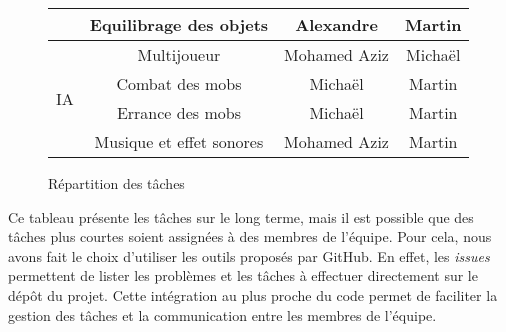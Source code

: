 \begin{figure}[H]
\begin{tabular}{|c|c|c|c|}
            \cline{2-4}
            & Equilibrage des objets & Alexandre & Martin \\
        \hline\hline
            & Multijoueur & Mohamed Aziz & Michaël \\
            \hline\hline
            \multirow{2}{*}{IA} & Combat des mobs & Michaël & Martin \\
            \cline{2-4}
            & Errance des mobs & Michaël & Martin \\
        \hline\hline
            & Musique et effet sonores & Mohamed Aziz & Martin \\
        \hline
    \end{tabular}
    \caption{R\'epartition des tâches}
    \label{fig:repartition_des_taches}
\end{figure}


Ce tableau présente les tâches sur le long terme, mais il est possible que des tâches plus courtes soient assignées à des membres de l'équipe.
Pour cela, nous avons fait le choix d'utiliser les outils proposés par GitHub.
En effet, les \textit{issues} permettent de lister les problèmes et les tâches à effectuer directement sur le dépôt du projet.
Cette intégration au plus proche du code permet de faciliter la gestion des tâches et la communication entre les membres de l'équipe.
\\








    








